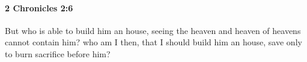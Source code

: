
		\paragraph{2 Chronicles 2:6} %
			\label{2CHRONICLES-2-6}

			But who is able to build him an house, seeing the heaven and heaven of heavens cannot contain him? who am I then, that I should build him an house, save only to burn sacrifice before him?


